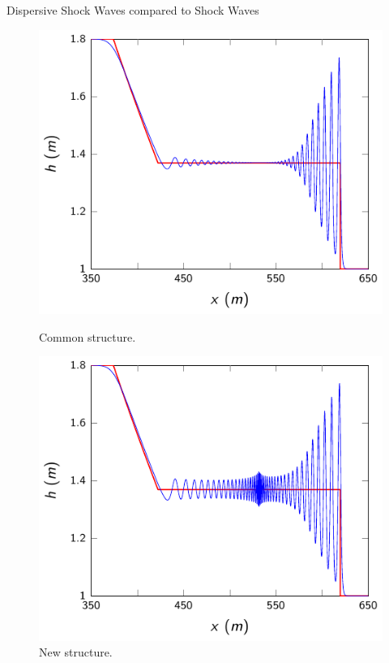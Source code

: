 \documentclass[pdf]{beamer}
\begin{document}

\begin{frame}{Dispersive Shock Waves compared to Shock Waves}
	\begin{figure}
		\hspace*{-0.9cm}%
		\begin{minipage}{.5\textwidth}
			\includegraphics[width=1.2\linewidth]{./Pictures/DSW/DSWcompSW.pdf}
			\caption{Common structure.}
		\end{minipage}%
		\hspace*{0.9cm}%
		\begin{minipage}{.5\textwidth}
			\includegraphics[width=1.2\linewidth]{./Pictures/DSW/DSWcompSW1.pdf}
			\caption{New structure.}
		\end{minipage}
	\end{figure}
\end{frame}
\end{document}
